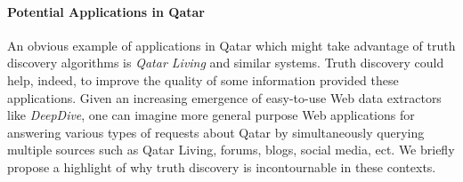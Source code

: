 \documentclass[paper=a4, fontsize=11pt]{scrartcl}	%
\numberwithin{equation}{section}															%
\numberwithin{figure}{section}																%
\numberwithin{table}{section}																%
\begin{document}
 \paragraph*{Potential Applications in Qatar}An obvious example of applications in Qatar which might take advantage 
 of truth discovery algorithms is \emph{Qatar Living} and similar systems. Truth discovery
 could help, indeed, to improve the quality of some  information provided these applications.
Given an increasing emergence of easy-to-use Web data extractors like \emph{DeepDive}, one 
can imagine more general purpose Web applications for answering various types of requests about Qatar by simultaneously querying multiple
sources such as Qatar Living, forums, blogs, social media, ect. We briefly propose a highlight of why truth discovery is incontournable in 
these contexts.
 
\end{document}
